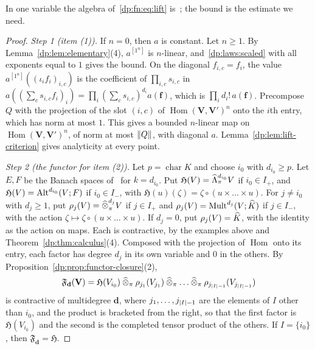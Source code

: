 In one variable the algebra of~\eqref{dp:fn:eq:lift} is~\cite[Th.~II.1]{Ro}; the bound is the estimate we need.

\begin{proof}
\emph{Step 1 (item (1)).} If $n=0$, then $a$ is constant. Let $n\ge1$. By Lemma~\ref{dp:lem:elementary}(4), $a^{[1^n]}$ is $n$\nobreakdash-linear, and~\eqref{dp:laws:scaled} with all exponents equal to $1$ gives the bound. On the diagonal $f_{i,c}=f_i$, the value $a^{[1^n]}((\iota_if_i)_{i,c})$ is the coefficient of $\prod_{i,c}s_{i,c}$ in $a((\sum_cs_{i,c}f_i)_i)=\prod_i(\sum_cs_{i,c})^{d_i}a(\mathbf f)$, which is $\prod_id_i!\,a(\mathbf f)$. Precompose $Q$ with the projection of the slot $(i,c)$ of $\operatorname{Hom}(\mathbf V,\mathbf V')^n$ onto the $i$th entry, which has norm at most $1$. This gives a bounded $n$\nobreakdash-linear map on $\operatorname{Hom}(\mathbf V,\mathbf V')^n$, of norm at most $\lVert Q\rVert$, with diagonal $a$. Lemma~\ref{dp:lem:lift-criterion} gives analyticity at every point.

\emph{Step 2 (the functor for item (2)).} Let $p=\operatorname{char}K$ and choose $i_0$ with $d_{i_0}\ge p$. Let $E,F$ be the Banach spaces of~\cite[Theorem~7.2(1)]{I} for $k=d_{i_0}$. Put $\mathfrak H(V)=\widehat\Lambda^{d_{i_0}}_\pi V$ if $i_0\in I_+$, and $\mathfrak H(V)=\operatorname{Alt}^{d_{i_0}}(V;F)$ if $i_0\in I_-$, with $\mathfrak H(u)(\zeta)=\zeta\circ(u\times\dots\times u)$. For $j\ne i_0$ with $d_j\ge1$, put $\rho_j(V)=\mathbin{\widehat\otimes}^{d_j}_\pi V$ if $j\in I_+$ and $\rho_j(V)=\operatorname{Mult}^{d_j}(V;\widehat K)$ if $j\in I_-$, with the action $\zeta\mapsto\zeta\circ(u\times\dots\times u)$. If $d_j=0$, put $\rho_j(V)=\widehat K$, with the identity as the action on maps. Each is contractive, by the examples above and Theorem~\ref{dp:thm:calculus}(4). Composed with the projection of $\operatorname{Hom}$ onto its entry, each factor has degree $d_j$ in its own variable and $0$ in the others. By Proposition~\ref{dp:prop:functor-closure}(2),
\[
 \mathfrak F_{\mathbf d}(\mathbf V)=\mathfrak H(V_{i_0})\mathbin{\widehat\otimes_\pi}\rho_{j_1}(V_{j_1})\mathbin{\widehat\otimes_\pi}\dots\mathbin{\widehat\otimes_\pi}\rho_{j_{\lvert I\rvert-1}}(V_{j_{\lvert I\rvert-1}})
\]
is contractive of multidegree $\mathbf d$, where $j_1,\dots,j_{\lvert I\rvert-1}$ are the elements of $I$ other than $i_0$, and the product is bracketed from the right, so that the first factor is $\mathfrak H(V_{i_0})$ and the second is the completed tensor product of the others. If $I=\{i_0\}$, then $\mathfrak F_{\mathbf d}=\mathfrak H$.


\end{proof}
